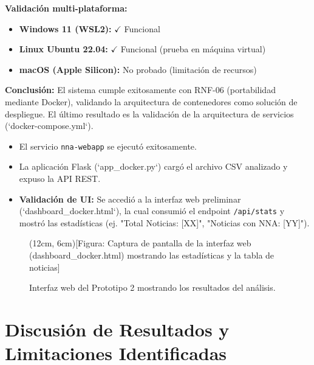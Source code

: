 \textbf{Validación multi-plataforma:}
\begin{itemize}
    \item \textbf{Windows 11 (WSL2):} $\checkmark$ Funcional
    \item \textbf{Linux Ubuntu 22.04:} $\checkmark$ Funcional (prueba en máquina virtual)
    \item \textbf{macOS (Apple Silicon):} No probado (limitación de recursos)
\end{itemize}

\textbf{Conclusión:} El sistema cumple exitosamente con RNF-06 (portabilidad mediante Docker), validando la arquitectura de contenedores como solución de despliegue.
El último resultado es la validación de la arquitectura de servicios (`docker-compose.yml`).
\begin{itemize}
    \item El servicio \texttt{nna-webapp} se ejecutó exitosamente.
    \item La aplicación Flask (`app\_docker.py`) cargó el archivo CSV analizado y expuso la API REST.
    \item \textbf{Validación de UI:} Se accedió a la interfaz web preliminar (`dashboard\_docker.html`), la cual consumió el endpoint \texttt{/api/stats} y mostró las estadísticas (ej. "Total Noticias: [XX]", "Noticias con NNA: [YY]").
\end{itemize}

\begin{figure}[h]
    \centering
    \framebox(12cm, 6cm){[Figura: Captura de pantalla de la interfaz web (dashboard\_docker.html) mostrando las estadísticas y la tabla de noticias]}
    \caption{Interfaz web del Prototipo 2 mostrando los resultados del análisis.}
    \label{fig:captura_dashboard}
\end{figure}


\section{Discusión de Resultados y Limitaciones Identificadas}
\label{sec:limitaciones_prototipo}

